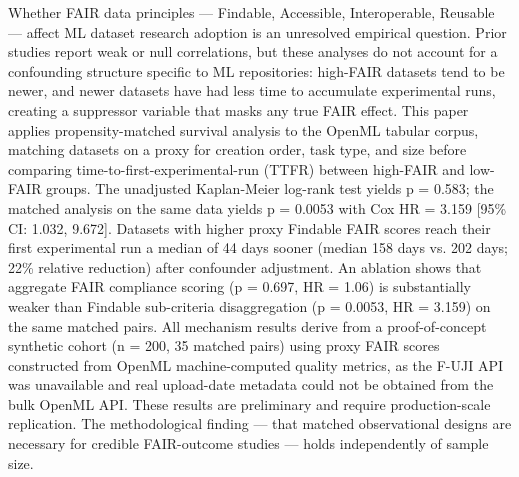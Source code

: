 
Whether FAIR data principles — Findable, Accessible, Interoperable, Reusable — affect ML dataset research adoption is an unresolved empirical question. Prior studies report weak or null correlations, but these analyses do not account for a confounding structure specific to ML repositories: high-FAIR datasets tend to be newer, and newer datasets have had less time to accumulate experimental runs, creating a suppressor variable that masks any true FAIR effect. This paper applies propensity-matched survival analysis to the OpenML tabular corpus, matching datasets on a proxy for creation order, task type, and size before comparing time-to-first-experimental-run (TTFR) between high-FAIR and low-FAIR groups. The unadjusted Kaplan-Meier log-rank test yields p = 0.583; the matched analysis on the same data yields p = 0.0053 with Cox HR = 3.159 [95\% CI: 1.032, 9.672]. Datasets with higher proxy Findable FAIR scores reach their first experimental run a median of 44 days sooner (median 158 days vs. 202 days; 22\% relative reduction) after confounder adjustment. An ablation shows that aggregate FAIR compliance scoring (p = 0.697, HR = 1.06) is substantially weaker than Findable sub-criteria disaggregation (p = 0.0053, HR = 3.159) on the same matched pairs. All mechanism results derive from a proof-of-concept synthetic cohort (n = 200, 35 matched pairs) using proxy FAIR scores constructed from OpenML machine-computed quality metrics, as the F-UJI API was unavailable and real upload-date metadata could not be obtained from the bulk OpenML API. These results are preliminary and require production-scale replication. The methodological finding — that matched observational designs are necessary for credible FAIR-outcome studies — holds independently of sample size.

